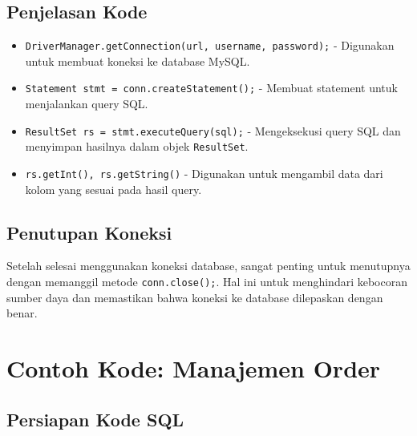 \subsection{Penjelasan Kode}

\begin{itemize}
	\item \texttt{DriverManager.getConnection(url, username, password);} - Digunakan untuk membuat koneksi ke database MySQL.
	\item \texttt{Statement stmt = conn.createStatement();} - Membuat statement untuk menjalankan query SQL.
	\item \texttt{ResultSet rs = stmt.executeQuery(sql);} - Mengeksekusi query SQL dan menyimpan hasilnya dalam objek \texttt{ResultSet}.
	\item \texttt{rs.getInt(), rs.getString()} - Digunakan untuk mengambil data dari kolom yang sesuai pada hasil query.
\end{itemize}

\subsection{Penutupan Koneksi}

Setelah selesai menggunakan koneksi database, sangat penting untuk menutupnya dengan memanggil metode \texttt{conn.close();}. Hal ini untuk menghindari kebocoran sumber daya dan memastikan bahwa koneksi ke database dilepaskan dengan benar.

\section{Contoh Kode: Manajemen Order}

\subsection{Persiapan Kode SQL}

